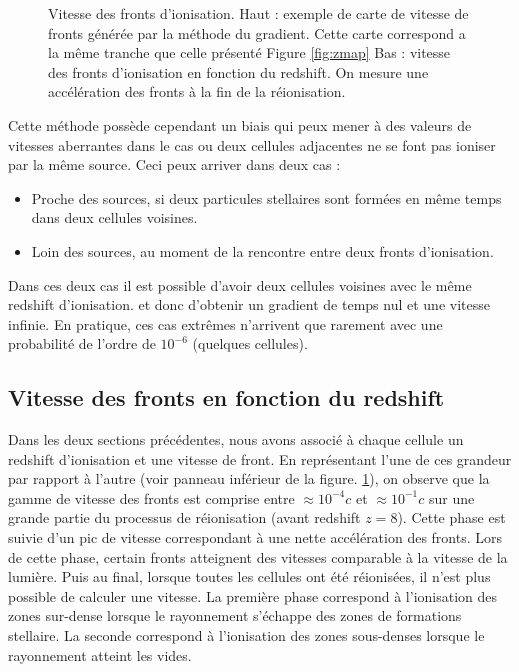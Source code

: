 \begin{figure}
        \caption[Vitesse des fronts d'ionisation]{Vitesse des fronts d'ionisation.
        Haut : exemple de carte de vitesse de fronts générée par la méthode du gradient.
		Cette carte correspond a la même tranche que celle présenté Figure \ref{fig:zmap}
		Bas : vitesse des fronts d'ionisation en fonction du redshift.
        On mesure une accélération des fronts à la fin de la réionisation.
        }
 		\label{fig:vmap}
\end{figure}

Cette méthode possède cependant un biais qui peux mener à des valeurs de vitesses aberrantes dans le cas ou deux cellules adjacentes ne se font pas ioniser par la même source.
Ceci peux arriver dans deux cas : 
\begin{itemize}
\item Proche des sources, si deux particules stellaires sont formées en même temps dans deux cellules voisines.
\item Loin des sources, au moment de la rencontre entre deux fronts d'ionisation.
\end{itemize}

Dans ces deux cas il est possible d'avoir deux cellules voisines avec le même redshift d'ionisation. et donc d'obtenir un gradient de temps nul et une vitesse infinie.
En pratique, ces cas extrêmes n'arrivent que rarement avec une probabilité de l'ordre de $10^{-6}$ (quelques cellules).

\subsection{Vitesse des fronts en fonction du redshift}


Dans les deux sections précédentes, nous avons associé à chaque cellule un redshift d'ionisation et une vitesse de front.
En représentant l'une de ces grandeur par rapport à l'autre (voir panneau inférieur de la figure. \ref{fig:vmap}), on observe que la gamme de vitesse des fronts est comprise entre $\approx 10^{-4}c$ et $\approx 10^{-1}c$ sur une grande partie du processus de réionisation (avant redshift $z=8$).
Cette phase est suivie d'un pic de vitesse correspondant à une nette accélération des fronts.
Lors de cette phase, certain fronts atteignent des vitesses comparable à la vitesse de la lumière.
Puis au final, lorsque toutes les cellules ont été réionisées, il n'est plus possible de calculer une vitesse.
La première phase correspond à l'ionisation des zones sur-dense lorsque le rayonnement s'échappe des zones de formations stellaire.
La seconde correspond à l'ionisation des zones sous-denses lorsque le rayonnement atteint les vides.



